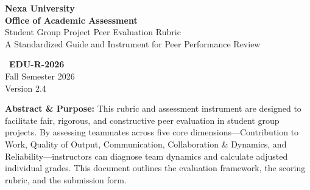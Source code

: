 \thispagestyle{plain}

\noindent
\begin{tcolorbox}[
  colback=nexanavy,
  colframe=nexanavy,
  arc=4pt,
  boxrule=0pt,
  left=15pt,
  right=15pt,
  top=15pt,
  bottom=15pt
]
  \begin{minipage}[t]{0.7\textwidth}
    \color{white}
    {\huge\bfseries Nexa University}\\[6pt]
    {\large\color{nexateal!40}\bfseries Office of Academic Assessment}\\[12pt]
    {\color{white}\Large Student Group Project Peer Evaluation Rubric}\\[4pt]
    {\color{nexaamber}\small A Standardized Guide and Instrument for Peer Performance Review}
  \end{minipage}%
  \begin{minipage}[t]{0.3\textwidth}
    \raggedleft
    \color{white}
    \faGraduationCap\ \textbf{EDU-R-2026}\\[4pt]
    \small
    Fall Semester 2026\\
    Version 2.4
  \end{minipage}
\end{tcolorbox}

\vspace{15pt}

\noindent
\begin{tcolorbox}[
  colback=nexabg,
  colframe=nexateal,
  arc=3pt,
  boxrule=0.8pt,
  left=10pt,
  right=10pt,
  top=8pt,
  bottom=8pt
]
  \small\color{nexacharcoal}
  \textbf{Abstract \& Purpose:} This rubric and assessment instrument are designed to facilitate fair, rigorous, and constructive peer evaluation in student group projects. By assessing teammates across five core dimensions---Contribution to Work, Quality of Output, Communication, Collaboration \& Dynamics, and Reliability---instructors can diagnose team dynamics and calculate adjusted individual grades. This document outlines the evaluation framework, the scoring rubric, and the submission form.
\end{tcolorbox}
